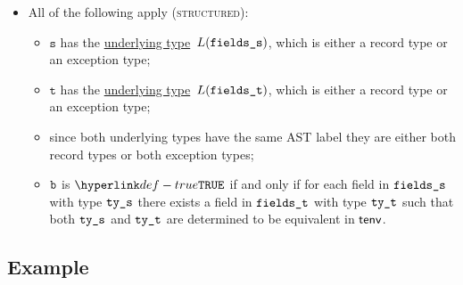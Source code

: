 \documentclass{book}
\newcommand\underlyingtype[0]{\hyperlink{def-underlyingtype}{underlying type}}
\newcommand\vt[0]{\texttt{t}}
\newcommand\vs[0]{\texttt{s}}
\begin{document}
\begin{itemize}
\item All of the following apply (\textsc{structured}):
  \begin{itemize}
  \item $\vs$ has the \underlyingtype\ $L(\texttt{fields\_s})$, which is either a record type or an exception type;
  \item $\vt$ has the \underlyingtype\ $L(\texttt{fields\_t})$, which is either a record type or an exception type;
  \item since both underlying types have the same AST label they are either both record types or both exception types;
  \item $\texttt{b}$ is $\True$ if and only if for each field in $\texttt{fields\_s}$ with type $\texttt{ty\_s}$
  there exists a field in $\texttt{fields\_t}$ with type $\texttt{ty\_t}$ such that both $\texttt{ty\_s}$ and $\texttt{ty\_t}$
  are determined to be equivalent in $\textsf{tenv}$.
  \end{itemize}
\end{itemize}

\subsection{Example}

\end{document}

